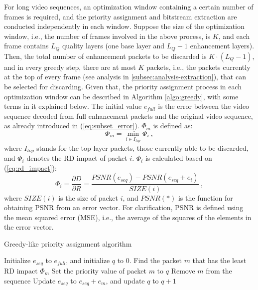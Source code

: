 \documentclass[journal]{IEEEtran}
\begin{document}
For long video sequences, an optimization window containing a certain number of frames is required, and the priority assignment and bitstream extraction are conducted independently in each window. Suppose the size of the optimization window, i.e., the number of frames involved in the above process, is $K$, and each frame contains $L_Q$ quality layers (one base layer and $L_Q-1$ enhancement layers). Then, the total number of enhancement packets to be discarded is $K \cdot (L_Q-1)$, and in every greedy step, there are at most $K$ packets, i.e., the packets currently at the top of every frame (see analysis in \ref{subsec:analysis-extraction}), that can be selected for discarding. Given that, the priority assignment process in each optimization window can be described in Algorithm \ref{algo:greedy}, with some terms in it explained below. The initial value $e_{full}$ is the error between the video sequence decoded from full enhancement packets and the original video sequence, as already introduced in (\ref{eq:subset_error}). $\Phi_m$ is defined as:
\begin{equation}
\label{eq:R-D_impact_m}
\Phi_m = \min_{i \in I_{top}} \Phi_i \: ,
\end{equation}
where $I_{top}$ stands for the top-layer packets, those currently able to be discarded, and $\Phi_i$ denotes the RD impact of packet $i$. $\Phi_i$ is calculated based on (\ref{eq:rd_impact}):
\begin{equation}
\label{eq:R-D_impact_i}
\Phi_i = \dfrac{\partial D}{\partial R} = \dfrac{PSNR(e_{seq}) - PSNR(e_{seq} + e_i)}{SIZE(i)} \:,
\end{equation}
where $SIZE(i)$ is the size of packet $i$, and $PSNR(*)$ is the function for obtaining PSNR from an error vector. For clarification, PSNR is defined using the mean squared error (MSE), i.e., the average of the squares of the elements in the error vector.

\begin{algorithm}
\caption{Greedy-like priority assignment algorithm}
\label{algo:greedy}
\begin{algorithmic}
    \STATE Initialize $e_{seq}$ to $e_{full}$, and initialize $q$ to 0.
		    \STATE Find the packet $m$ that has the least RD impact $\Phi_m$
		\ENDFOR
		\STATE Set the priority value of packet $m$ to $q$
		\STATE Remove $m$ from the sequence
		\STATE Update $e_{seq}$ to $e_{seq} + e_m$, and update $q$ to $q+1$
    \ENDWHILE
\end{algorithmic}
\end{algorithm}
\end{document}

